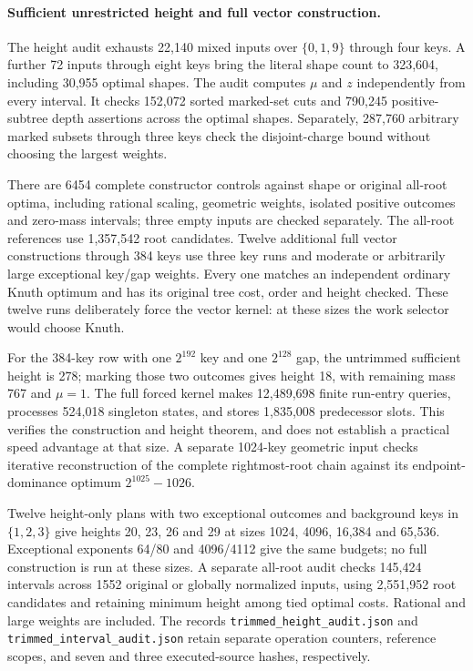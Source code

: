 \documentclass[11pt]{article}
\begin{document}
\paragraph{Sufficient unrestricted height and full vector construction.}
The height audit exhausts 22,140 mixed inputs over $\{0,1,9\}$ through
four keys. A further 72 inputs through eight keys bring the literal shape
count to 323,604, including 30,955 optimal shapes. The audit computes
$\mu$ and $z$ independently from every interval. It checks 152,072 sorted
marked-set cuts and 790,245 positive-subtree depth assertions across the
optimal shapes. Separately, 287,760 arbitrary marked subsets through three
keys check the disjoint-charge bound without choosing the largest weights.

There are 6454 complete constructor controls against shape or original
all-root optima, including rational scaling, geometric weights, isolated
positive outcomes and zero-mass intervals; three empty inputs are checked
separately. The all-root references use 1,357,542 root candidates. Twelve
additional full vector constructions through 384 keys use three key runs
and moderate or arbitrarily large exceptional key/gap weights. Every one
matches an independent ordinary Knuth optimum and has its original tree
cost, order and height checked. These twelve runs deliberately force the
vector kernel: at these sizes the work selector would choose Knuth.

For the 384-key row with one $2^{192}$ key and one $2^{128}$ gap, the
untrimmed sufficient height is 278; marking those two outcomes gives
height 18, with remaining mass 767 and $\mu=1$. The full forced kernel
makes 12,489,698 finite run-entry queries, processes 524,018 singleton
states, and stores 1,835,008 predecessor slots. This verifies the
construction and height theorem, and does not establish a practical
speed advantage at that size. A separate 1024-key geometric input checks
iterative reconstruction of the complete rightmost-root chain against
its endpoint-dominance optimum $2^{1025}-1026$.

Twelve height-only plans with two exceptional outcomes and background
keys in $\{1,2,3\}$ give heights 20, 23, 26 and 29 at sizes 1024, 4096,
16,384 and 65,536. Exceptional exponents 64/80 and 4096/4112 give the
same budgets; no full construction is run at these sizes. A separate
all-root audit checks 145,424 intervals across 1552 original or globally
normalized inputs, using 2,551,952 root candidates and retaining minimum
height among tied optimal costs. Rational and large weights are included.
The records \texttt{trimmed\_height\_audit.json} and
\texttt{trimmed\_interval\_audit.json} retain separate operation counters,
reference scopes, and seven and three executed-source hashes, respectively.
\end{document}
